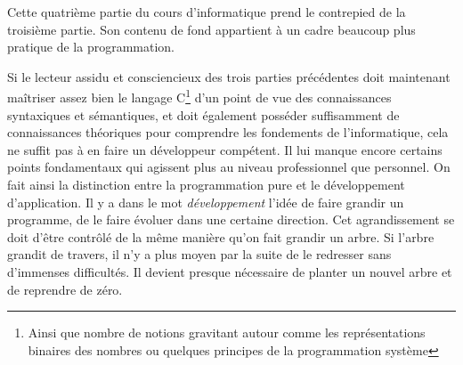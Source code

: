 \documentclass[../../main.tex]{subfiles}
\begin{document}
Cette quatrième partie du cours d'informatique prend le contrepied de la troisième partie. Son contenu de fond appartient à un cadre beaucoup plus pratique de la programmation.
 
Si le lecteur assidu et consciencieux des trois parties précédentes doit maintenant maîtriser assez bien le langage C\footnote{Ainsi que nombre de notions gravitant autour comme les représentations binaires des nombres ou quelques principes de la programmation système} d'un point de vue des connaissances syntaxiques et sémantiques, et doit également posséder suffisamment de connaissances théoriques pour comprendre les fondements de l'informatique, cela ne suffit pas à en faire un développeur compétent. Il lui manque encore certains points fondamentaux qui agissent plus au niveau professionnel que personnel. On fait ainsi la distinction entre la programmation pure et le développement d'application. Il y a dans le mot \textit{développement} l'idée de faire grandir un programme, de le faire évoluer dans une certaine direction. Cet agrandissement se doit d'être contrôlé de la même manière qu'on fait grandir un arbre. Si l'arbre grandit de travers, il n'y a plus moyen par la suite de le redresser sans d'immenses difficultés. Il devient presque nécessaire de planter un nouvel arbre et de reprendre de zéro.
\end{document}
